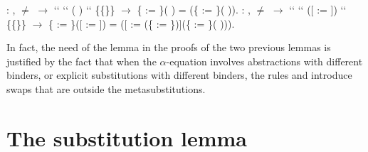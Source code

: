 \begin{coqdoccode}
\coqdocemptyline
\coqdocnoindent
{} : \coqdockw{\ensuremath{\forall}}     ,  \ensuremath{\not=}  \ensuremath{\rightarrow}  ``   ``  (  ) `` \{\{\}\} \ensuremath{\rightarrow} \{ := \}(  ) =   (\{ := \}(   )).\coqdoceol
\coqdocemptyline
\coqdocnoindent
{}  : \coqdockw{\ensuremath{\forall}}      ,  \ensuremath{\not=}  \ensuremath{\rightarrow}  ``   ``  ([ := ]) `` \{\{\}\} \ensuremath{\rightarrow} \{ := \}([ := ]) = ([ := (\{ := \})](\{ := \}(   ))).\coqdoceol
\coqdocemptyline
\end{coqdoccode}
In fact, the need of the lemma  in the proofs of the two previous lemmas is justified by the fact that when the $\alpha$-equation involves abstractions with different binders, or explicit substitutions with different binders, the rules  and  introduce swaps that are outside the metasubstitutions. 
\begin{coqdoccode}
\coqdocemptyline
\coqdocemptyline
\end{coqdoccode}
\section{The substitution lemma}




